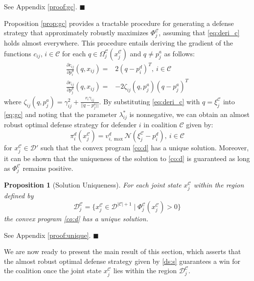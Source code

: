 \documentclass[journal]{IEEEtran}
\newenvironment{Proof}{\noindent{\em Proof:\/}}{\hfill $\blacksquare$\par}
\newtheorem{Proposition}{\bf Proposition}
\newcommand{\n}{\mathscr{N}}
\newcommand{\D}{\mathcal{D}}
\newcommand{\C}{\mathcal{C}}
\newcommand{\1}{\mathbf{1}}
\begin{document}
\begin{Proof}
See Appendix \ref{proof:gc}.
\end{Proof}

Proposition \ref{prop:gc} provides a tractable procedure for generating a defense strategy that approximately robustly maximizes $\Phi^\C_j$, assuming that \eqref{eq:deri_c} holds almost everywhere. This procedure entails deriving the gradient of the functions $c_{ij}$, $i\in \C$ for each $q\in \Omega^\C_j(x^\C_j)$ and $q\neq p^a_j$ as follows:
\begin{equation}\label{eq:deri_c}
    \begin{split}
	    \frac{\partial c_{ij}}{\partial p^d_i}(q,x_{ij})=&2(q-p^d_i)^T,~i\in \C\\
	    \frac{\partial c_{ij}}{\partial p^a_j}(q,x_{ij})=&-2\zeta_{ij}(q,p^a_j)(q-p^a_j)^T
	\end{split}
\end{equation}
where $\zeta_{ij}(q,p^a_j)=\gamma_{ij}^2+\frac{r_i\gamma_{ij}}{||q-p^a_j||}$. By substituting \eqref{eq:deri_c} with $q=\xi^\C_j$ into \eqref{eq:gc} and noting that the parameter $\lambda_{ij}^*$ is nonnegative, we can obtain an almost robust optimal defense strategy for defender $i$ in coalition $\C$ given by:
\begin{equation}\label{ds:s}
    \pi^d_i(x^\C_j)=v^d_{i,\max}\n(\xi^\C_j-p^d_i),~i\in \C
\end{equation}
for $x^\C_j\in \D'$ such that the convex program \eqref{co:d} has a unique solution. Moreover, it can be shown that the uniqueness of the solution to \eqref{co:d} is guaranteed as long as $\Phi^\C_j$ remains positive.

\begin{Proposition}[Solution Uniqueness]\label{prop:unique}
For each joint state $x^\C_j$ within the region defined by
\begin{equation*}
    \D^\C_j=\Big\{x^\C_j\in \D^{|\C|+1}\mid\Phi^\C_j(x^\C_j)>0\Big\}
\end{equation*}
the convex program \eqref{co:d} has a unique solution.
\end{Proposition}

\begin{Proof}
See Appendix \ref{proof:unique}.
\end{Proof}

We are now ready to present the main result of this section, which asserts that the almost robust optimal defense strategy given by \eqref{ds:s} guarantees a win for the coalition once the joint state $x^\C_j$ lies within the region $\D^\C_j$.
\end{document}

